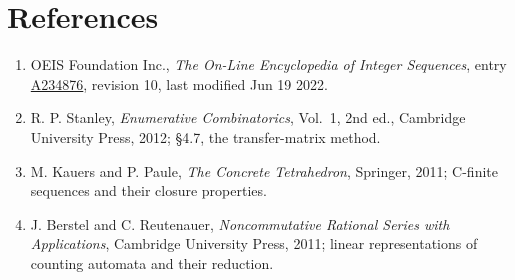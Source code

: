 \documentclass[11pt]{article}
\theoremstyle{definition}
\begin{document}
\section{References}

\begin{enumerate}

\item OEIS Foundation Inc., \emph{The On-Line Encyclopedia of Integer Sequences}, entry \href{https://oeis.org/A234876}{A234876}, revision 10, last modified Jun 19 2022.

\item R. P. Stanley, \emph{Enumerative Combinatorics}, Vol.~1, 2nd ed., Cambridge University Press, 2012; \S4.7, the transfer-matrix method.

\item M. Kauers and P. Paule, \emph{The Concrete Tetrahedron}, Springer, 2011; C-finite sequences and their closure properties.

\item J. Berstel and C. Reutenauer, \emph{Noncommutative Rational Series with Applications}, Cambridge University Press, 2011; linear representations of counting automata and their reduction.

\end{enumerate}
\end{document}
